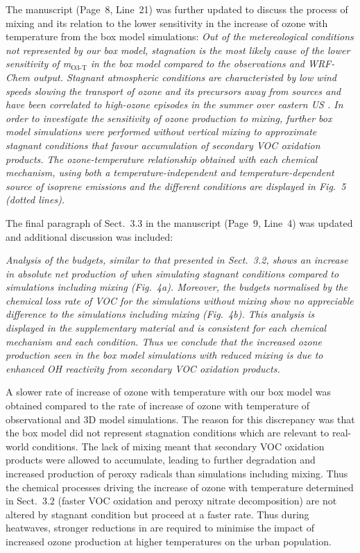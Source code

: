 \documentclass{article}
\begin{document}
The manuscript (Page~8, Line~21) was further updated to discuss the process of mixing and its relation to the lower sensitivity in the increase of ozone with temperature from the box model simulations:
\textit{
Out of the metereological conditions not represented by our box model, stagnation is the most likely cause of the lower sensitivity of m$_{\text{O3-T}}$ in the box model compared to the observations and WRF-Chem output.
Stagnant atmospheric conditions are characteristed by low wind speeds slowing the transport of ozone and its precursors away from sources and have been correlated to high-ozone episodes in the summer over eastern US \citep{Jacob:1993}.
In order to investigate the sensitivity of ozone production to mixing, further box model simulations were performed without vertical mixing to approximate stagnant conditions that favour accumulation of secondary VOC oxidation products.
The ozone-temperature relationship obtained with each chemical mechanism, using both a temperature-independent and temperature-dependent source of isoprene emissions and the different  conditions are displayed in Fig.~5 (dotted lines).
}

The final paragraph of Sect.~3.3 in the manuscript (Page~9, Line~4) was updated and additional discussion was included:
{\itshape
Analysis of the  budgets, similar to that presented in Sect.~3.2, shows an increase in absolute net production of  when simulating stagnant conditions compared to simulations including mixing (Fig.~4a).
Moreover, the  budgets normalised by the chemical loss rate of VOC for the simulations without mixing show no appreciable difference to the simulations including mixing (Fig.~4b).
This analysis is displayed in the supplementary material and is consistent for each chemical mechanism and each  condition.
Thus we conclude that the increased ozone production seen in the box model simulations with reduced mixing is due to enhanced OH reactivity from secondary VOC oxidation products.

A slower rate of increase of ozone with temperature with our box model was obtained compared to the rate of increase of ozone with temperature of observational and 3D model simulations.
The reason for this discrepancy was that the box model did not represent stagnation conditions which are relevant to real-world conditions.
The lack of mixing meant that secondary VOC oxidation products were allowed to accumulate, leading to further degradation and increased production of peroxy radicals than simulations including mixing. 
Thus the chemical processes driving the increase of ozone with temperature determined in Sect.~3.2 (faster VOC oxidation and peroxy nitrate decomposition) are not altered by stagnant condition but proceed at a faster rate.
Thus during heatwaves, stronger reductions in  are required to minimise the impact of increased ozone production at higher temperatures on the urban population.
}
\end{document}
